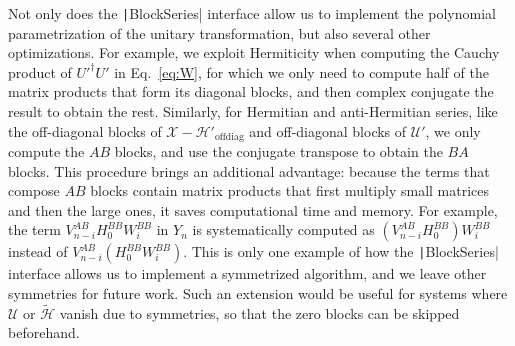 Not only does the \texttt|BlockSeries| interface allow us to
implement the polynomial parametrization of the unitary transformation, but
also several other optimizations.
For example, we exploit Hermiticity when computing the Cauchy product of
$U'^{\dagger}U'$ in Eq.~\eqref{eq:W}, for which we only need to compute half of
the matrix products that form its diagonal blocks, and then complex conjugate
the result to obtain the rest.
Similarly, for Hermitian and anti-Hermitian series, like the off-diagonal
blocks of $\mathcal{X} - \mathcal{H}'_\textrm{offdiag}$ and off-diagonal blocks
of $\mathcal{U}'$, we only compute the $AB$ blocks, and use the conjugate
transpose to obtain the $BA$ blocks.
This procedure brings an additional advantage: because the terms that compose
$AB$ blocks contain matrix products that first multiply small matrices and then
the large ones, it saves computational time and memory.
For example, the term $V_{n -i}^{AB} H_0^{BB}
W_i^{BB}$ in $Y_n$ is systematically computed as $(V_{n -i}^{AB}
H_0^{BB}) W_i^{BB}$ instead of $V_{n -i}^{AB}
(H_0^{BB} W_i^{BB})$.
This is only one example of how the \texttt|BlockSeries| interface
allows us to implement a symmetrized algorithm, and we leave other symmetries
for future work.
Such an extension would be useful for systems where $\mathcal{U}$ or
$\tilde{\mathcal{H}}$ vanish due to symmetries, so that the zero blocks can be
skipped beforehand.

